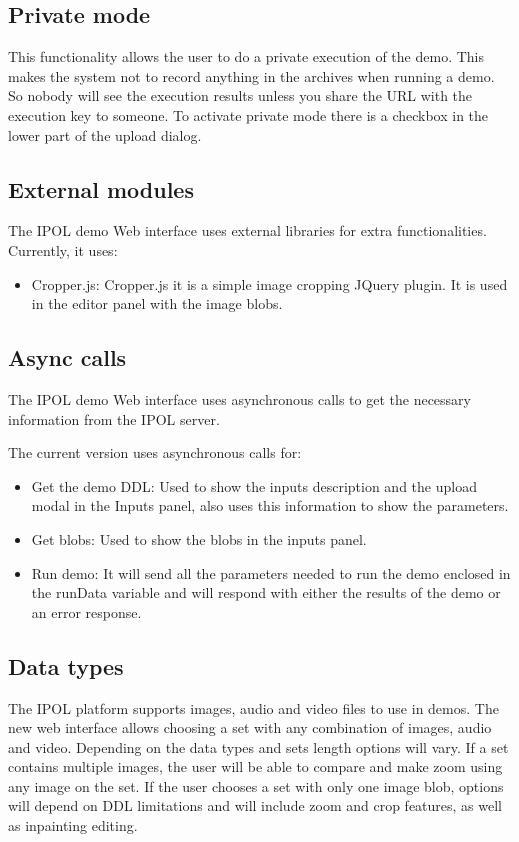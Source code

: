 \subsection{Private mode}
This functionality allows the user to do a private execution of the demo. This makes the system not to record anything in the archives when running 
a demo. So nobody will see the execution results unless you share the URL with the execution key to someone. To activate private 
mode there is a checkbox in the lower part of the upload dialog.

\subsection{External modules}

The IPOL demo Web interface uses external libraries for extra functionalities.
Currently, it uses:

\begin{itemize}
\item Cropper.js: Cropper.js it is a simple image cropping JQuery plugin. It is used in the editor panel with the image blobs.
\end{itemize}


\subsection{Async calls}
The IPOL demo Web interface uses asynchronous calls to get the necessary information from the IPOL server.

The current version uses asynchronous calls for:
\begin{itemize}
\item Get the demo DDL: Used to show the inputs description and the upload modal in the Inputs panel, also uses this information to show the parameters.
\item Get blobs: Used to show the blobs in the inputs panel.
\item Run demo: It will send all the parameters needed to run the demo enclosed in the runData variable and will respond with either the results of 
the demo or an error response.
\end{itemize}


\subsection{Data types}
The IPOL platform supports images, audio and video files to use in demos. The new web interface 
allows choosing a set with any combination of images, audio and video. Depending on the data types and sets length options will vary. 
If a set contains multiple images, the user will be able to compare and make zoom using any image on the set. If the user chooses a set with only 
one image blob, options will depend on DDL limitations and will include zoom and crop features, as well as inpainting editing.

